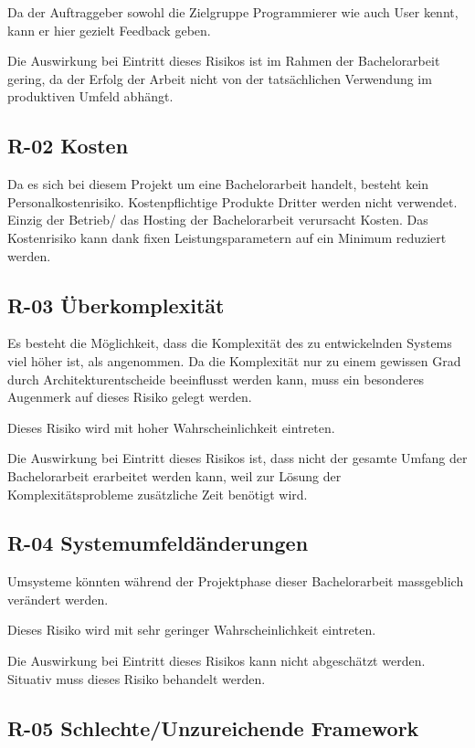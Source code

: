 Da der Auftraggeber sowohl die Zielgruppe Programmierer wie auch User
kennt, kann er hier gezielt Feedback geben.

Die Auswirkung bei Eintritt dieses Risikos ist im Rahmen der
Bachelorarbeit gering, da der Erfolg der Arbeit nicht von der
tatsächlichen Verwendung im produktiven Umfeld abhängt.

\subsection{R-02 Kosten}\label{r-02-kosten}

Da es sich bei diesem Projekt um eine Bachelorarbeit handelt, besteht
kein Personalkostenrisiko. Kostenpflichtige Produkte Dritter werden
nicht verwendet. Einzig der Betrieb/ das Hosting der Bachelorarbeit
verursacht Kosten. Das Kostenrisiko kann dank fixen Leistungsparametern
auf ein Minimum reduziert werden.

\subsection{R-03 Überkomplexität}\label{r-03-uxfcberkomplexituxe4t}

Es besteht die Möglichkeit, dass die Komplexität des zu entwickelnden
Systems viel höher ist, als angenommen. Da die Komplexität nur zu einem
gewissen Grad durch Architekturentscheide beeinflusst werden kann, muss
ein besonderes Augenmerk auf dieses Risiko gelegt werden.

Dieses Risiko wird mit hoher Wahrscheinlichkeit eintreten.

Die Auswirkung bei Eintritt dieses Risikos ist, dass nicht der gesamte
Umfang der Bachelorarbeit erarbeitet werden kann, weil zur Lösung der
Komplexitätsprobleme zusätzliche Zeit benötigt wird.

\subsection{R-04
Systemumfeldänderungen}\label{r-04-systemumfelduxe4nderungen}

Umsysteme könnten während der Projektphase dieser Bachelorarbeit
massgeblich verändert werden.

Dieses Risiko wird mit sehr geringer Wahrscheinlichkeit eintreten.

Die Auswirkung bei Eintritt dieses Risikos kann nicht abgeschätzt
werden. Situativ muss dieses Risiko behandelt werden.

\subsection{R-05 Schlechte/Unzureichende
Framework}\label{r-05-schlechteunzureichende-framework}

